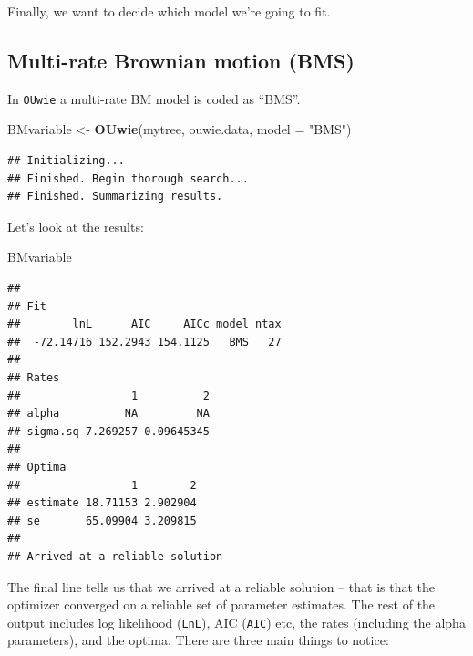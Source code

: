 \documentclass[]{book}
\newenvironment{Shaded}{\begin{snugshade}}{\end{snugshade}}
\newcommand{\KeywordTok}[1]{\textcolor[rgb]{0.13,0.29,0.53}{\textbf{{#1}}}}
\newcommand{\DataTypeTok}[1]{\textcolor[rgb]{0.13,0.29,0.53}{{#1}}}
\newcommand{\StringTok}[1]{\textcolor[rgb]{0.31,0.60,0.02}{{#1}}}
\newcommand{\NormalTok}[1]{{#1}}
\begin{document}
Finally, we want to decide which model we're going to fit.

\subsection{Multi-rate Brownian motion
(BMS)}\label{multi-rate-brownian-motion-bms}

In \texttt{OUwie} a multi-rate BM model is coded as ``BMS''.

\begin{Shaded}
\begin{Highlighting}[]
\NormalTok{BMvariable <-}\StringTok{ }\KeywordTok{OUwie}\NormalTok{(mytree, ouwie.data, }\DataTypeTok{model =} \StringTok{"BMS"}\NormalTok{)}
\end{Highlighting}
\end{Shaded}

\begin{verbatim}
## Initializing... 
## Finished. Begin thorough search... 
## Finished. Summarizing results.
\end{verbatim}

Let's look at the results:

\begin{Shaded}
\begin{Highlighting}[]
\NormalTok{BMvariable}
\end{Highlighting}
\end{Shaded}

\begin{verbatim}
## 
## Fit
##        lnL      AIC     AICc model ntax
##  -72.14716 152.2943 154.1125   BMS   27
## 
## Rates
##                 1          2
## alpha          NA         NA
## sigma.sq 7.269257 0.09645345
## 
## Optima
##                 1        2
## estimate 18.71153 2.902904
## se       65.09904 3.209815
## 
## Arrived at a reliable solution
\end{verbatim}

The final line tells us that we arrived at a reliable solution -- that
is that the optimizer converged on a reliable set of parameter
estimates. The rest of the output includes log likelihood
(\texttt{LnL}), AIC (\texttt{AIC}) etc, the rates (including the alpha
parameters), and the optima. There are three main things to notice:
\end{document}
